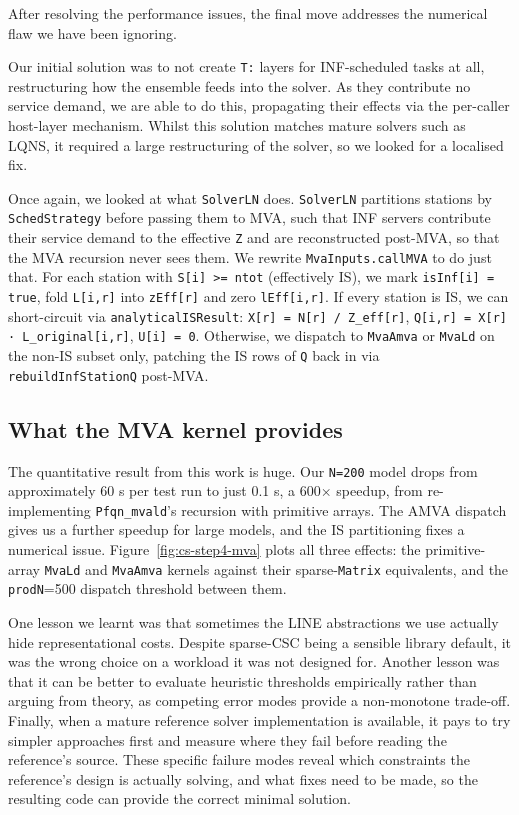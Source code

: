 After resolving the performance issues, the final move addresses the numerical flaw we have been ignoring.

Our initial solution was to not create \texttt{T:} layers for INF-scheduled tasks at all, restructuring how the ensemble feeds into the solver. As they contribute no service demand, we are able to do this, propagating their effects via the per-caller host-layer mechanism. Whilst this solution matches mature solvers such as LQNS, it required a large restructuring of the solver, so we looked for a localised fix.

Once again, we looked at what \texttt{SolverLN} does. \texttt{SolverLN} partitions stations by \texttt{SchedStrategy} before passing them to MVA, such that INF servers contribute their service demand to the effective \texttt{Z} and are reconstructed post-MVA, so that the MVA recursion never sees them. We rewrite \texttt{MvaInputs.callMVA} to do just that. For each station with \texttt{S[i] >= ntot} (effectively IS), we mark \texttt{isInf[i] = true}, fold \texttt{L[i,r]} into \texttt{zEff[r]} and zero \texttt{lEff[i,r]}. If every station is IS, we can short-circuit via \texttt{analyticalISResult}: \texttt{X[r] = N[r] / Z\_eff[r]}, \texttt{Q[i,r] = X[r] · L\_original[i,r]}, \texttt{U[i] = 0}. Otherwise, we dispatch to \texttt{MvaAmva} or \texttt{MvaLd} on the non-IS subset only, patching the IS rows of \texttt{Q} back in via \texttt{rebuildInfStationQ} post-MVA.

\subsection{What the MVA kernel provides}

The quantitative result from this work is huge. Our \texttt{N=200} model drops from approximately 60 s per test run to just 0.1 s, a 600$\times$ speedup, from re-implementing \texttt{Pfqn\_mvald}'s recursion with primitive arrays. The AMVA dispatch gives us a further speedup for large models, and the IS partitioning fixes a numerical issue. Figure~\ref{fig:cs-step4-mva} plots all three effects: the primitive-array \texttt{MvaLd} and \texttt{MvaAmva} kernels against their sparse-\texttt{Matrix} equivalents, and the \texttt{prodN}=500 dispatch threshold between them.
 
One lesson we learnt was that sometimes the LINE abstractions we use actually hide representational costs. Despite sparse-CSC being a sensible library default, it was the wrong choice on a workload it was not designed for. Another lesson was that it can be better to evaluate heuristic thresholds empirically rather than arguing from theory, as competing error modes provide a non-monotone trade-off. Finally, when a mature reference solver implementation is available, it pays to try simpler approaches first and measure where they fail before reading the reference's source. These specific failure modes reveal which constraints the reference's design is actually solving, and what fixes need to be made, so the resulting code can provide the correct minimal solution. 
 
